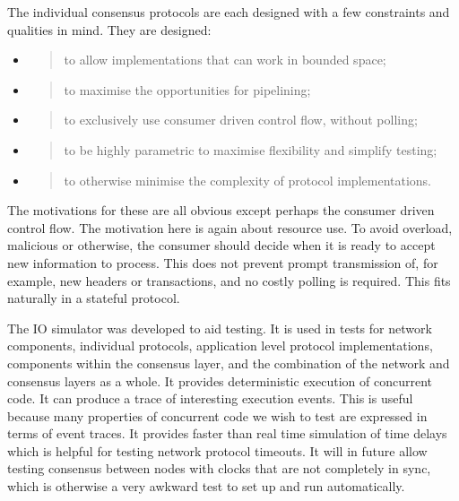 \documentclass[]{article}
\begin{document}
The individual consensus protocols are each designed with a few
constraints and qualities in mind. They are designed:

\begin{itemize}
\item
  \begin{quote}
  to allow implementations that can work in bounded space;
  \end{quote}
\item
  \begin{quote}
  to maximise the opportunities for pipelining;
  \end{quote}
\item
  \begin{quote}
  to exclusively use consumer driven control flow, without polling;
  \end{quote}
\item
  \begin{quote}
  to be highly parametric to maximise flexibility and simplify testing;
  \end{quote}
\item
  \begin{quote}
  to otherwise minimise the complexity of protocol implementations.
  \end{quote}
\end{itemize}

The motivations for these are all obvious except perhaps the consumer
driven control flow. The motivation here is again about resource use. To
avoid overload, malicious or otherwise, the consumer should decide when
it is ready to accept new information to process. This does not prevent
prompt transmission of, for example, new headers or transactions, and no
costly polling is required. This fits naturally in a stateful protocol.

The IO simulator was developed to aid testing. It is used in tests for
network components, individual protocols, application level protocol
implementations, components within the consensus layer, and the
combination of the network and consensus layers as a whole. It provides
deterministic execution of concurrent code. It can produce a trace of
interesting execution events. This is useful because many properties of
concurrent code we wish to test are expressed in terms of event traces.
It provides faster than real time simulation of time delays which is
helpful for testing network protocol timeouts. It will in future allow
testing consensus between nodes with clocks that are not completely in
sync, which is otherwise a very awkward test to set up and run
automatically.
\end{document}
